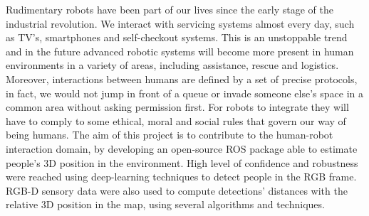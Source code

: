 Rudimentary robots have been part of our lives since the early stage of the industrial revolution. We interact with servicing systems almost every day, such as TV's, smartphones and self-checkout systems. This is an unstoppable trend and in the future advanced robotic systems will become more present in human environments in a variety of areas, including assistance, rescue and logistics. Moreover, interactions between humans are defined by a set of precise protocols, in fact, we would not jump in front of a queue or invade someone else's space in a common area without asking permission first. For robots to integrate they will have to comply to some ethical, moral and social rules that govern our way of being humans. The aim of this project is to contribute to the human-robot interaction domain, by developing an open-source ROS package able to estimate people's 3D position in the environment. High level of confidence and robustness were reached using deep-learning techniques to detect people in the RGB frame. RGB-D sensory data were also used to compute detections' distances with the relative 3D position in the map, using several algorithms and techniques.
